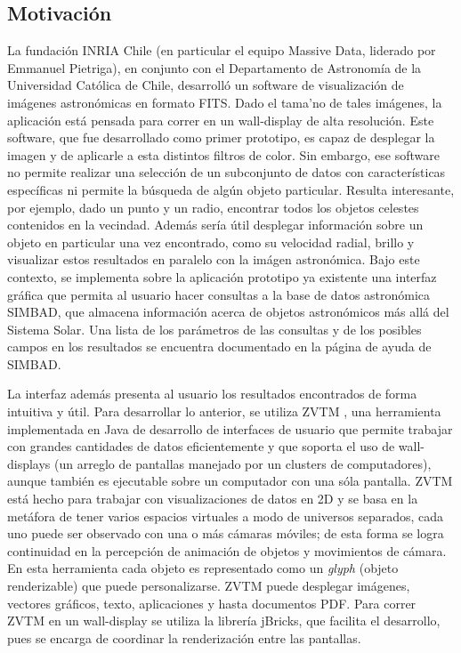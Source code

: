 \begin{intro}
\section*{Motivaci\'on}
La fundaci\'on INRIA Chile (en particular el equipo Massive Data, liderado por Emmanuel Pietriga), en conjunto con el Departamento de Astronom\'ia de la Universidad Cat\'olica de Chile, desarroll\'o un software de visualizaci\'on de im\'agenes astron\'omicas en formato FITS. Dado el tama'no de tales im\'agenes, la aplicaci\'on est\'a pensada para correr en un wall-display de alta resoluci\'on. Este software, que fue desarrollado como primer prototipo, es capaz de desplegar la imagen y de aplicarle a esta distintos filtros de color. Sin embargo, ese software no permite realizar una selecci\'on de un subconjunto de datos con características específicas ni permite la b\'usqueda de alg\'un objeto particular. Resulta interesante, por ejemplo, dado un punto y un radio, encontrar todos los objetos celestes contenidos en la vecindad. Adem\'as ser\'ia \'util desplegar informaci\'on sobre un objeto en particular una vez encontrado, como su velocidad radial, brillo y visualizar estos resultados en paralelo con la imágen astron\'omica.
Bajo este contexto, se implementa sobre la aplicaci\'on prototipo ya existente una interfaz gr\'afica que permita al usuario hacer consultas a la base de datos astron\'omica SIMBAD, que almacena informaci\'on acerca de objetos astron\'omicos m\'as all\'a del Sistema Solar. Una lista de los par\'ametros de las consultas y de los posibles campos en los resultados se encuentra documentado en la página de ayuda de SIMBAD.

 La interfaz adem\'as presenta al usuario los resultados encontrados de forma intuitiva y \'util. Para desarrollar lo anterior, se utiliza ZVTM , una herramienta implementada en Java de desarrollo de interfaces de usuario que permite trabajar con grandes cantidades de datos eficientemente y que soporta el uso de wall-displays (un arreglo de pantallas manejado por un clusters de computadores), aunque tambi\'en es ejecutable sobre un computador con una s\'ola pantalla. ZVTM est\'a hecho para trabajar con visualizaciones de datos en 2D y se basa en la met\'afora de tener varios espacios virtuales a modo de universos separados, cada uno puede ser observado con una o m\'as c\'amaras m\'oviles; de esta forma se logra continuidad en la percepci\'on de animaci\'on de objetos y movimientos de c\'amara. En esta herramienta cada objeto es representado como un \textit{glyph} (objeto renderizable) que puede personalizarse. ZVTM puede desplegar im\'agenes, vectores gr\'aficos, texto, aplicaciones y hasta documentos PDF. Para correr ZVTM en un wall-display se utiliza la librer\'ia jBricks, que facilita el desarrollo, pues se encarga de coordinar la renderizaci\'on entre las pantallas.


\end{intro}
